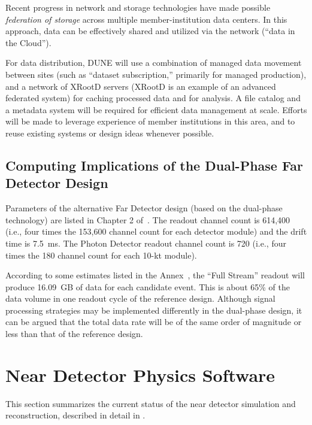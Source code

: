 Recent progress in network and storage technologies have made possible
\textit{federation of storage} across multiple member-institution data centers. %
In this approach, data can be effectively shared
and utilized via the network (``data in the Cloud''). 

For data distribution, DUNE will use a combination of managed data movement between
sites (such as ``dataset subscription,'' primarily for managed
production), and a network of XRootD servers (XRootD is an example of an advanced federated system) for caching processed data
and for analysis.  A file catalog and a metadata system
will be required for efficient data management at scale. Efforts
will be made to leverage experience of member institutions in this
area, and to reuse existing systems or design ideas whenever
possible.

\subsection{Computing Implications of the Dual-Phase Far Detector Design}
\label{sec:detectors-sc-alternate}
Parameters of the alternative Far Detector design (based on the
dual-phase technology) are listed in Chapter 2 of~\cite{cdr-annex-rates}. The readout channel count is 614,400 (i.e., four times the
          153,600 channel count for each  detector module) and the drift time is 7.5~ms.
The Photon Detector readout channel count is 720 (i.e., four times the 180
          channel count for each 10-kt module).

According to some estimates listed in the Annex~\cite{cdr-annex-rates}, the ``Full Stream''
readout will produce 16.09~GB of data for each candidate event. This is
about 65\% of the data volume in one readout cycle of the reference
design.  Although signal processing strategies may be implemented
differently in the dual-phase design, it can be argued that the total
data rate will be of the same order of magnitude or less than that of the
reference design.

\section{Near Detector Physics Software}
\label{sec:detectors-sc-nd-physics-software}

This section summarizes the %
current status of the near detector
simulation and reconstruction, described in detail in \anxreco. %

